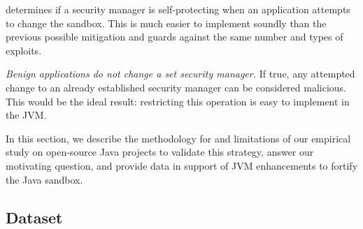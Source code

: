 \documentclass{sig-alternate}
\begin{document}
\begin{flushenum}
  determines if a security manager is self-protecting when an application
  attempts to change the sandbox. This is much easier to implement soundly than
  the previous possible mitigation and guards against the same number and types of
  exploits.
\item \textit{Benign applications do not change a set security manager.} If
  true, any attempted change to an already established security manager can be
  considered malicious. This would be the ideal result: restricting this
  operation is easy to implement in the JVM.
\end{flushenum}

In this section, we describe the
methodology for and limitations of our empirical study
on open-source Java projects to validate this strategy, answer our
motivating question, and provide data in support of JVM enhancements to fortify
the Java sandbox.  

\subsection{Dataset}\label{sec:Applications-Studied}
\end{document}
